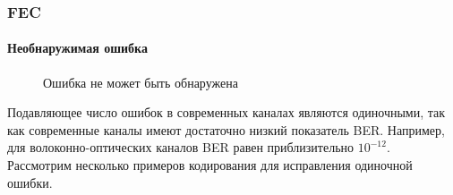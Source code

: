 \begin{frame}
    \frametitle{FEC}
    \framesubtitle{Необнаружимая ошибка}
    
    \begin{figure}
        \begin{center}
            \caption{Ошибка не может быть обнаружена}\label{pict:fecFail}
        \end{center}
    \end{figure} 
\end{frame}


Подавляющее число ошибок в современных каналах являются одиночными, так как современные каналы имеют достаточно низкий показатель BER. Например, для волоконно-оптических каналов BER равен приблизительно $10^{-12}$. Рассмотрим несколько примеров кодирования для исправления одиночной ошибки.


